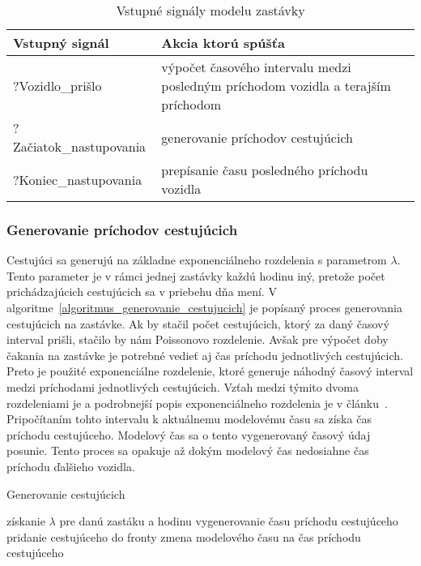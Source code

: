 \begin{table}[h]\label{tab:inputs_zastavky}
  \centering
  \begin{tabularx}{\textwidth}{|l|X|}
    \hline
    \textbf{Vstupný signál} & \textbf{Akcia ktorú spúšťa} \\ \hline
    ?Vozidlo\_prišlo & výpočet časového intervalu medzi posledným príchodom vozidla a terajším príchodom\\ \hline
    ?Začiatok\_nastupovania & generovanie príchodov cestujúcich \\ \hline
    ?Koniec\_nastupovania & prepísanie času posledného príchodu vozidla \\ \hline
  \end{tabularx}
  \caption{Vstupné signály modelu zastávky}
\end{table}

\subsubsection*{Generovanie príchodov cestujúcich}
Cestujúci sa generujú na základne exponenciálneho rozdelenia s parametrom $\lambda$.
Tento parameter je v rámci jednej zastávky každú hodinu iný, pretože počet prichádzajúcich cestujúcich sa v priebehu dňa mení.
V algoritme~\ref{algoritmus_generovanie_cestujucich} je popísaný proces generovania cestujúcich na zastávke.
Ak by stačil počet cestujúcich, ktorý za daný časový interval prišli, stačilo by nám Poissonovo rozdelenie.
Avšak pre výpočet doby čakania na zastávke je potrebné vedieť aj čas príchodu jednotlivých cestujúcich.
Preto je použité exponenciálne rozdelenie, ktoré generuje náhodný časový interval medzi príchodami jednotlivých cestujúcich.
Vzťah medzi týmito dvoma rozdeleniami je a podrobnejší popis exponenciálneho rozdelenia je v článku~\cite{geraghty2022exponential}.
Pripočítaním tohto intervalu k aktuálnemu modelovému času sa získa čas príchodu cestujúceho.
Modelový čas sa o tento vygenerovaný časový údaj posunie.
Tento proces sa opakuje až dokým modelový čas nedosiahne čas príchodu ďalšieho vozidla.

\vspace*{\dimexpr0.5\baselineskip\relax}
\begin{algorithm}[H]\label{algoritmus_generovanie_cestujucich}
\caption{Generovanie cestujúcich}
  získanie $\lambda$ pre danú zastáku a hodinu\;
   {
    vygenerovanie času príchodu cestujúceho\;
    pridanie cestujúceho do fronty\;
    zmena modelového času na čas príchodu cestujúceho\;
  }
\end{algorithm}

